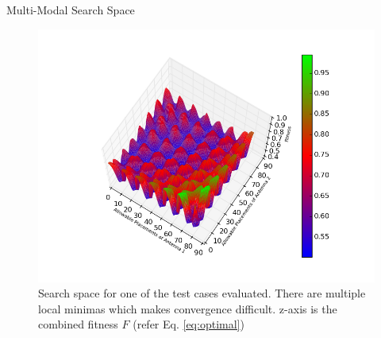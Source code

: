 \documentclass{beamer}
\begin{document}
\begin{frame}[t]{Multi-Modal Search Space}
    \begin{figure}
        \vspace*{-0.35cm}
        \centering
        \includegraphics[scale=0.4]{../paper/FIG/tc1_ss}
        \caption*{Search space for one of the test cases evaluated. There are multiple local minimas which makes convergence difficult. z-axis is the combined fitness $F$ (refer Eq. \ref{eq:optimal})}
    \end{figure}
\end{frame}
\end{document}
